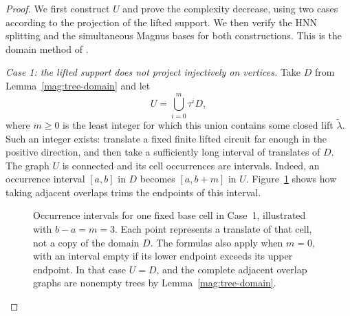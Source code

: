 \begin{proof}
We first construct $U$ and prove the complexity decrease, using
two cases according to the projection of the lifted support.
We then verify the HNN splitting and the simultaneous Magnus
bases for both constructions.  This is the domain method of
\cite[Propositions~4.9 and~4.11]{LintonHierarchies2025}.

\smallskip\noindent
\emph{Case 1: the lifted support does not project injectively on vertices.}
Take $D$ from
Lemma~\ref{mag:tree-domain} and let
\[
 U=\bigcup_{i=0}^{m}\tau^iD,
\]
where $m\geq0$ is the least integer for which this union contains
some closed lift $\widetilde\lambda$.
Such an integer exists: translate a fixed finite lifted circuit
far enough in the positive direction, and then take a sufficiently
long interval of translates of $D$.
The graph $U$ is connected and its cell occurrences are intervals.
Indeed, an occurrence interval $[a,b]$ in $D$ becomes $[a,b+m]$
in $U$.  Figure~\ref{mag:domain-intervals} shows how taking
adjacent overlaps trims the endpoints of this interval.

\begin{figure}[!hb]
\centering
{}
\caption{Occurrence intervals for one fixed base cell in Case~1,
illustrated with $b-a=m=3$.  Each point represents a translate of
that cell, not a copy of the domain $D$.  The formulas also apply
when $m=0$, with an interval empty if its lower endpoint exceeds
its upper endpoint.  In that case $U=D$, and the complete adjacent
overlap graphs are nonempty trees by Lemma~\ref{mag:tree-domain}.}
\label{mag:domain-intervals}
\end{figure}


\end{proof}
